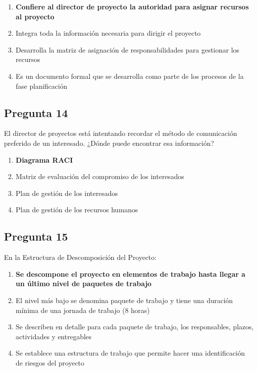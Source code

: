 \documentclass[11pt,a4paper]{article}
\begin{document}
\begin{enumerate}[label=\alph*)]
  \item \textbf{Confiere al director de proyecto la autoridad para asignar recursos al proyecto}
  \item Integra toda la información necesaria para dirigir el proyecto
  \item Desarrolla la matriz de asignación de responsabilidades para gestionar los recursos
  \item Es un documento formal que se desarrolla como parte de los procesos de la fase planificación
\end{enumerate}

\subsection*{Pregunta 14}
El director de proyectos está intentando recordar el método de comunicación preferido de un interesado. ¿Dónde puede encontrar esa información?

\begin{enumerate}[label=\alph*)]
  \item \textbf{Diagrama RACI}
  \item Matriz de evaluación del compromiso de los interesados
  \item Plan de gestión de los interesados
  \item Plan de gestión de los recursos humanos
\end{enumerate}

\subsection*{Pregunta 15}
En la Estructura de Descomposición del Proyecto:

\begin{enumerate}[label=\alph*)]
  \item \textbf{Se descompone el proyecto en elementos de trabajo hasta llegar a un último nivel de paquetes de trabajo}
  \item El nivel más bajo se denomina paquete de trabajo y tiene una duración mínima de una jornada de trabajo (8 horas)
  \item Se describen en detalle para cada paquete de trabajo, los responsables, plazos, actividades y entregables
  \item Se establece una estructura de trabajo que permite hacer una identificación de riesgos del proyecto
\end{enumerate}
\end{document}
